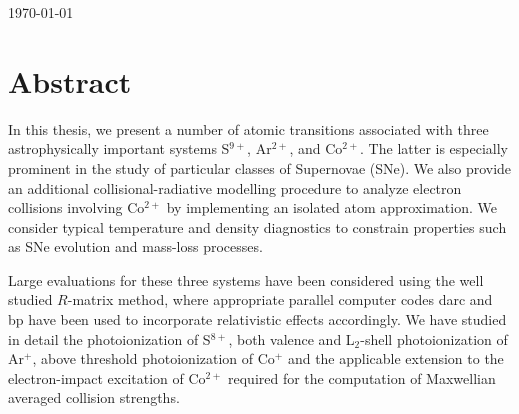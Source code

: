 \documentclass[12pt, a4paper, oneside]{Thesis} %
\begin{document}
\begin{titlepage}
\begin{center}
{\large \today}\\[4cm] %
 
\vfill
\end{center}

\end{titlepage}


\clearpage %


\pagestyle{empty} %





\chapter*{Abstract}
In this thesis, we present a number of atomic transitions associated with three astrophysically important systems S$^{9+}$, Ar$^{2+}$, and Co$^{2+}$. The latter is especially prominent in the study of particular classes of Supernovae (SNe). We also provide an additional collisional-radiative modelling procedure to analyze electron collisions involving Co$^{2+}$ by implementing an isolated atom approximation. We consider typical temperature and density diagnostics to constrain properties such as SNe evolution and mass-loss processes.

Large evaluations for these three systems have been considered using the well studied $R$-matrix method, where appropriate parallel computer codes {\sc darc} and {\sc bp} have been used to incorporate relativistic effects accordingly. We have studied in detail the photoionization of S$^{8+}$, both valence and L$_2$-shell photoionization of Ar$^{+}$, above threshold photoionization of Co$^{+}$ and the applicable extension to the electron-impact excitation of Co$^{2+}$ required for the computation of Maxwellian averaged collision strengths.
\end{document}
